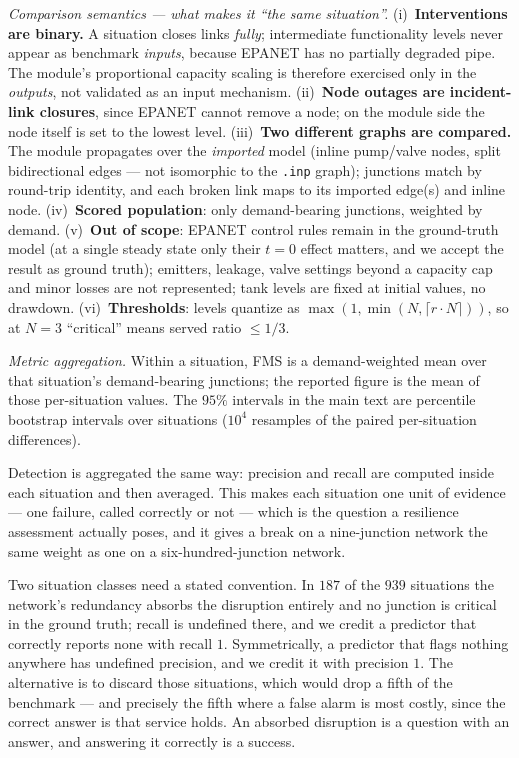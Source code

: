 \documentclass[11pt]{article}
\begin{document}
\emph{Comparison semantics --- what makes it ``the same situation''.}
(i)~\textbf{Interventions are binary.} A situation closes links \emph{fully};
intermediate functionality levels never appear as benchmark \emph{inputs},
because EPANET has no partially degraded pipe. The module's proportional capacity
scaling is therefore exercised only in the \emph{outputs}, not validated as an
input mechanism. (ii)~\textbf{Node outages are incident-link closures}, since
EPANET cannot remove a node; on the module side the node itself is set to the
lowest level. (iii)~\textbf{Two different graphs are compared.} The module
propagates over the \emph{imported} model (inline pump/valve nodes, split
bidirectional edges --- not isomorphic to the \texttt{.inp} graph); junctions
match by round-trip identity, and each broken link maps to its imported edge(s)
and inline node. (iv)~\textbf{Scored population}: only demand-bearing junctions,
weighted by demand. (v)~\textbf{Out of scope}: EPANET control rules remain in the
ground-truth model (at a single steady state only their $t{=}0$ effect matters,
and we accept the result as ground truth); emitters, leakage, valve settings
beyond a capacity cap and minor losses are not represented; tank levels are fixed
at initial values, no drawdown. (vi)~\textbf{Thresholds}: levels quantize as
$\max(1,\min(N,\lceil r \cdot N\rceil))$, so at $N{=}3$ ``critical'' means served
ratio $\le 1/3$.

\emph{Metric aggregation.} Within a situation, FMS is a demand-weighted mean over
that situation's demand-bearing junctions; the reported figure is the mean of those
per-situation values. The $95\%$ intervals in the main text are percentile bootstrap
intervals over situations ($10^4$ resamples of the paired per-situation differences).

Detection is aggregated the same way: precision and recall are computed inside each
situation and then averaged. This makes each situation one unit of evidence --- one
failure, called correctly or not --- which is the question a resilience assessment
actually poses, and it gives a break on a nine-junction network the same weight as one
on a six-hundred-junction network.

Two situation classes need a stated convention. In $187$ of the $939$ situations the
network's redundancy absorbs the disruption entirely and no junction is critical in the
ground truth; recall is undefined there, and we credit a predictor that correctly
reports none with recall $1$. Symmetrically, a predictor that flags nothing anywhere
has undefined precision, and we credit it with precision $1$. The alternative is to
discard those situations, which would drop a fifth of the benchmark --- and precisely
the fifth where a false alarm is most costly, since the correct answer is that service
holds. An absorbed disruption is a question with an answer, and answering it correctly
is a success.
\end{document}
